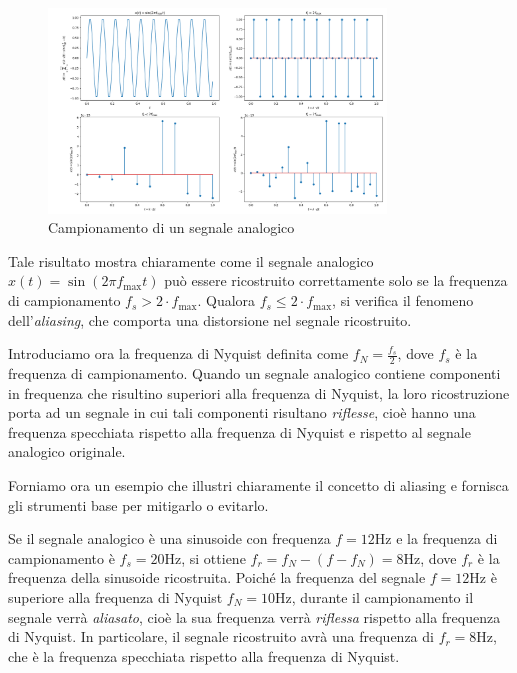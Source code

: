 \documentclass[a4paper,12pt]{report}  %
\begin{document}
\begin{figure}[h]
    \centering
    \includegraphics[width=0.8\textwidth]{imgs/nyquist-shannon.png}
    \caption{Campionamento di un segnale analogico}
    \label{fig:Nyquist-Shannon}
\end{figure}

Tale risultato mostra chiaramente come il segnale analogico $x(t) = \sin(2 \pi f_{\text{max}} t)$ può essere ricostruito correttamente solo se la frequenza di campionamento $f_s > 2 \cdot f_{\text{max}}$.
Qualora $f_s \leq 2 \cdot f_{\text{max}}$, si verifica il fenomeno dell'\textit{aliasing}, che comporta una distorsione nel segnale ricostruito.

Introduciamo ora la frequenza di Nyquist definita come $f_N = \frac{f_s}{2}$, dove $f_s$ è la frequenza di campionamento.
Quando un segnale analogico contiene componenti in frequenza che risultino superiori alla frequenza di Nyquist, la loro ricostruzione porta ad un segnale in cui tali componenti risultano \textit{riflesse}, cioè hanno una frequenza specchiata rispetto alla frequenza di Nyquist e rispetto al segnale analogico originale.

Forniamo ora un esempio che illustri chiaramente il concetto di aliasing e fornisca gli strumenti base per mitigarlo o evitarlo.

Se il segnale analogico è una sinusoide con frequenza $f = 12 \text{Hz}$ e la frequenza di campionamento è $f_s = 20 \text{Hz}$, si ottiene $f_r = f_N - (f - f_N) = 8 \text{Hz}$, dove $f_r$ è la frequenza della sinusoide ricostruita.
Poiché la frequenza del segnale $f = 12 \text{Hz}$ è superiore alla frequenza di Nyquist $f_N = 10 \text{Hz}$, durante il campionamento il segnale verrà \textit{aliasato}, cioè la sua frequenza verrà \textit{riflessa} rispetto alla frequenza di Nyquist.
In particolare, il segnale ricostruito avrà una frequenza di $f_r = 8 \text{Hz}$, che è la frequenza specchiata rispetto alla frequenza di Nyquist.
\end{document}
